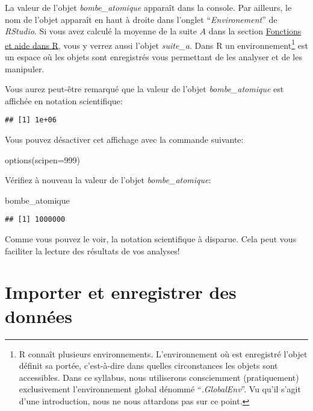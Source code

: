 \documentclass[
]{book}
\newenvironment{Shaded}{\begin{snugshade}}{\end{snugshade}}
\newcommand{\AttributeTok}[1]{\textcolor[rgb]{0.77,0.63,0.00}{#1}}
\newcommand{\DecValTok}[1]{\textcolor[rgb]{0.00,0.00,0.81}{#1}}
\newcommand{\FunctionTok}[1]{\textcolor[rgb]{0.00,0.00,0.00}{#1}}
\newcommand{\NormalTok}[1]{#1}
\begin{document}
La valeur de l'objet \emph{bombe\_atomique} apparaît dans la console. Par ailleurs, le nom de l'objet apparaît en haut à droite dans l'onglet ``\emph{Environement}'' de \emph{RStudio}. Si vous avez calculé la moyenne de la suite \(A\) dans la section \protect\hyperlink{Fonctions_aides}{Fonctions et aide dans R}, vous y verrez aussi l'objet \emph{suite\_a}. Dans R un environnement\footnote{R connaît plusieurs environnements. L'environnement où est enregistré l'objet définit sa portée, c'est-à-dire dans quelles circonstances les objets sont accessibles. Dans ce syllabus, nous utiliserons consciemment (pratiquement) exclusivement l'environnement global dénommé ``\emph{.GlobalEnv}''. Vu qu'il s'agit d'une introduction, nous ne nous attardons pas sur ce point.} est un espace où les objets sont enregistrés vous permettant de les analyser et de les manipuler.

Vous aurez peut-être remarqué que la valeur de l'objet \emph{bombe\_atomique} est affichée en notation scientifique:

\begin{verbatim}
## [1] 1e+06
\end{verbatim}

Vous pouvez désactiver cet affichage avec la commande suivante:

\begin{Shaded}
\begin{Highlighting}[]
\FunctionTok{options}\NormalTok{(}\AttributeTok{scipen=}\DecValTok{999}\NormalTok{)}
\end{Highlighting}
\end{Shaded}

Vérifiez à nouveau la valeur de l'objet \emph{bombe\_atomique}:

\begin{Shaded}
\begin{Highlighting}[]
\NormalTok{bombe\_atomique}
\end{Highlighting}
\end{Shaded}

\begin{verbatim}
## [1] 1000000
\end{verbatim}

Comme vous pouvez le voir, la notation scientifique à disparue. Cela peut vous faciliter la lecture des résultats de vos analyses!

\hypertarget{import_donnees}{%
\section{Importer et enregistrer des données}\label{import_donnees}}
\end{document}
